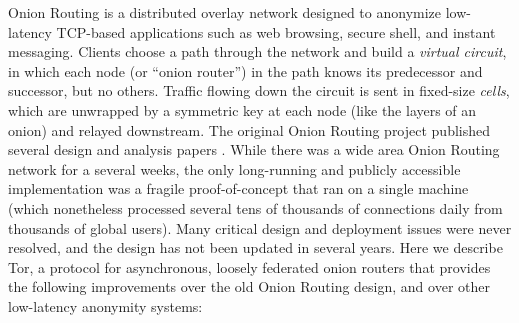 \documentclass[times,10pt,twocolumn]{article}
\begin{document}
Onion Routing is a distributed overlay network designed to anonymize
low-latency TCP-based applications such as web browsing, secure shell,
and instant messaging. Clients choose a path through the network and
build a \emph{virtual circuit}, in which each node (or ``onion router'') 
in the path knows its
predecessor and successor, but no others. Traffic flowing down the circuit
is sent in fixed-size \emph{cells}, which are unwrapped by a symmetric key
at each node (like the layers of an onion) and relayed downstream. The
original Onion Routing project published several design and analysis
papers
\cite{or-jsac98,or-discex00,or-ih96,or-pet00}. While there was
a wide area Onion Routing network for a several weeks,
the only long-running and publicly accessible
implementation was a fragile proof-of-concept that ran on a single
machine (which nonetheless processed several tens of thousands of connections
daily from thousands of global users).
Many critical design and deployment issues were never resolved,
and the design has not been updated in several years.
Here we describe Tor, a protocol for asynchronous, loosely
federated onion routers that provides the following improvements over
the old Onion Routing design, and over other low-latency anonymity systems:
\end{document}

